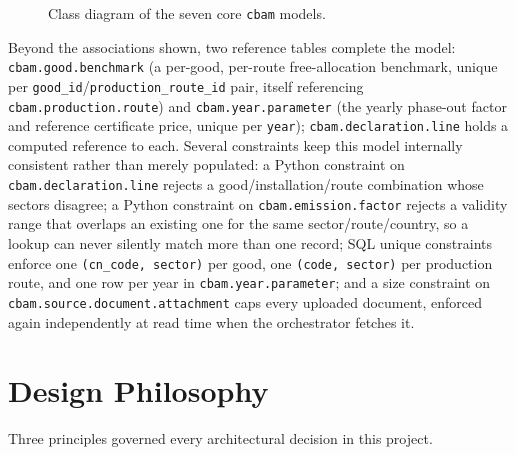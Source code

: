 \begin{figure}[H]
{%
}
\vspace{0.2cm}
\caption{Class diagram of the seven core \texttt{cbam} models.}
\label{fig:class_cbam}
\end{figure}
\FloatBarrier

Beyond the associations shown, two reference tables complete the model:
\texttt{cbam.good.benchmark} (a per-good, per-route free-allocation
benchmark, unique per \texttt{good\_id}/\texttt{production\_route\_id}
pair, itself referencing \texttt{cbam.production.route}) and
\texttt{cbam.year.parameter} (the yearly phase-out factor and reference
certificate price, unique per \texttt{year}); \texttt{cbam.declaration.line}
holds a computed reference to each. Several constraints keep this model
internally consistent rather than merely populated: a Python constraint on
\texttt{cbam.declaration.line} rejects a good/installation/route
combination whose sectors disagree; a Python constraint on
\texttt{cbam.emission.factor} rejects a validity range that overlaps an
existing one for the same sector/route/country, so a lookup can never
silently match more than one record; SQL unique constraints enforce one
\texttt{(cn\_code, sector)} per good, one \texttt{(code, sector)} per
production route, and one row per year in \texttt{cbam.year.parameter};
and a size constraint on \texttt{cbam.source.document.attachment} caps
every uploaded document, enforced again independently at read time when
the orchestrator fetches it.

\section{Design Philosophy}
\label{sec:design_philosophy_cbam}

Three principles governed every architectural decision in this project.


